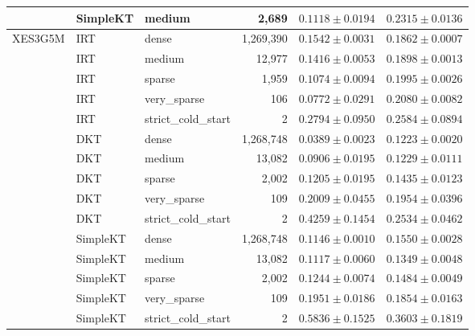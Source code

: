 \begin{table}[t]
{\begin{tabular}{lllrcc}
 & SimpleKT & medium & 2,689 & $0.1118 \pm 0.0194$ & $0.2315 \pm 0.0136$ \\
\midrule
XES3G5M & IRT & dense & 1,269,390 & $0.1542 \pm 0.0031$ & $0.1862 \pm 0.0007$ \\
 & IRT & medium & 12,977 & $0.1416 \pm 0.0053$ & $0.1898 \pm 0.0013$ \\
 & IRT & sparse & 1,959 & $0.1074 \pm 0.0094$ & $0.1995 \pm 0.0026$ \\
 & IRT & very\_sparse & 106 & $0.0772 \pm 0.0291$ & $0.2080 \pm 0.0082$ \\
 & IRT & strict\_cold\_start & 2 & $0.2794 \pm 0.0950$ & $0.2584 \pm 0.0894$ \\
 & DKT & dense & 1,268,748 & $0.0389 \pm 0.0023$ & $0.1223 \pm 0.0020$ \\
 & DKT & medium & 13,082 & $0.0906 \pm 0.0195$ & $0.1229 \pm 0.0111$ \\
 & DKT & sparse & 2,002 & $0.1205 \pm 0.0195$ & $0.1435 \pm 0.0123$ \\
 & DKT & very\_sparse & 109 & $0.2009 \pm 0.0455$ & $0.1954 \pm 0.0396$ \\
 & DKT & strict\_cold\_start & 2 & $0.4259 \pm 0.1454$ & $0.2534 \pm 0.0462$ \\
 & SimpleKT & dense & 1,268,748 & $0.1146 \pm 0.0010$ & $0.1550 \pm 0.0028$ \\
 & SimpleKT & medium & 13,082 & $0.1117 \pm 0.0060$ & $0.1349 \pm 0.0048$ \\
 & SimpleKT & sparse & 2,002 & $0.1244 \pm 0.0074$ & $0.1484 \pm 0.0049$ \\
 & SimpleKT & very\_sparse & 109 & $0.1951 \pm 0.0186$ & $0.1854 \pm 0.0163$ \\
 & SimpleKT & strict\_cold\_start & 2 & $0.5836 \pm 0.1525$ & $0.3603 \pm 0.1819$ \\
\bottomrule
\end{tabular}
}
\end{table}
